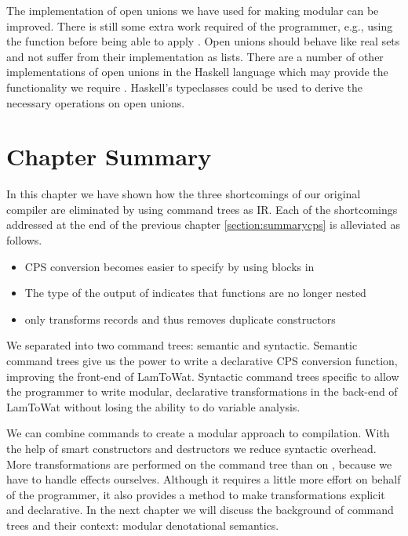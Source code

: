 The implementation of open unions we have used for making  modular can be improved. There is still some extra work required of the programmer, e.g., using the function  before being able to apply . Open unions should behave like real sets and not suffer from their implementation as lists. There are a number of other implementations of open unions in the Haskell language which may provide the functionality we require \autocite{extensible-effects, open-union}. Haskell's typeclasses could be used to derive the necessary operations on open unions.

\section{\label{section:summarytree}Chapter Summary}
In this chapter we have shown how the three shortcomings of our original compiler are eliminated by using command trees as IR. Each of the shortcomings addressed at the end of the previous chapter \ref{section:summarycps} is alleviated as follows. 

\begin{itemize}
\item CPS conversion becomes easier to specify by using blocks in 
\item The type of the output of  indicates that functions are no longer nested
\item {} only transforms records and thus removes duplicate constructors
\end{itemize}

We separated  into two command trees: semantic and syntactic. Semantic command trees give us the power to write a declarative CPS conversion function, improving the front-end of LamToWat. Syntactic command trees specific to  allow the programmer to write modular, declarative transformations in the back-end of LamToWat without losing the ability to do variable analysis.

We can combine commands to create a modular approach to compilation. With the help of smart constructors and destructors we reduce syntactic overhead. More transformations are performed on the command tree than on , because we have to handle effects ourselves. Although it requires a little more effort on behalf of the programmer, it also provides a method to make transformations explicit and declarative. In the next chapter we will discuss the background of command trees and their context: modular denotational semantics.
